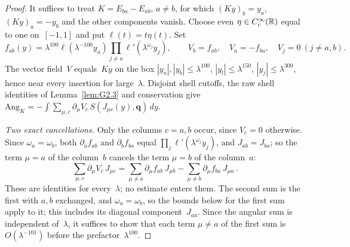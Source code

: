 \begin{proof}
It suffices to treat $K=E_{ba}-E_{ab}$, $a\ne b$, for which $(Ky)_b=y_a$, $(Ky)_a=-y_b$ and the other components vanish. Choose even $\eta\in C_c^\infty(\mathbb{R})$ equal to one on~$[-1,1]$ and put $\ell(t)=t\eta(t)$. Set
\begin{equation*}
f_{ab}(y)=\lambda^{100}\ell(\lambda^{-100}y_a)
 \prod_{j\ne a}\ell'(\lambda^{\omega_j}y_j),\qquad
V_b=f_{ab},\quad V_a=-f_{ba},\quad V_j=0\ (j\ne a,b).
\end{equation*}
The vector field~$V$ equals~$Ky$ on the box $|y_a|,|y_b|\le\lambda^{100}$, $|y_l|\le\lambda^{150}$, $|y_j|\le\lambda^{300}$, hence near every insertion for large~$\lambda$. Disjoint shell cutoffs, the raw shell identities of Lemma~\ref{lem:G2.3} and conservation give $\mathrm{Ang}_K=-\int\sum_{\mu,c}\partial_\mu V_c\,S(J_{\mu c}(y),\boldsymbol q)\,dy$.

\emph{Two exact cancellations.} Only the columns $c=a,b$ occur, since $V_c=0$ otherwise. Since $\omega_a=\omega_b$, both $\partial_af_{ab}$ and $\partial_bf_{ba}$ equal $\prod_j\ell'(\lambda^{\omega_j}y_j)$, and $J_{ab}=J_{ba}$; so the term $\mu=a$ of the column~$b$ cancels the term $\mu=b$ of the column~$a$:
\begin{equation}\label{eq:G-cancellations}
\sum_{\mu,c}\partial_\mu V_c\,J_{\mu c}
=\sum_{\mu\ne a}\partial_\mu f_{ab}\,J_{\mu b}-\sum_{\mu\ne b}\partial_\mu f_{ba}\,J_{\mu a}\,.
\end{equation}
These are identities for every~$\lambda$; no estimate enters them. The second sum is the first with $a,b$ exchanged, and $\omega_a=\omega_b$, so the bounds below for the first sum apply to it; this includes its diagonal component~$J_{aa}$. Since the angular sum is independent of~$\lambda$, it suffices to show that each term $\mu\ne a$ of the first sum is $O(\lambda^{-101})$ before the prefactor~$\lambda^{100}$.


\end{proof}

